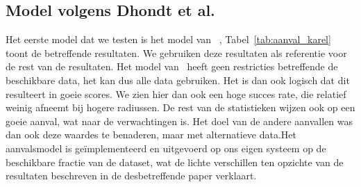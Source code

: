 \subsection{Model volgens Dhondt et al.}
Het eerste model dat we testen is het model van
\citeauthor{Dhondt}~\cite{Dhondt}, Tabel~\ref{tab:aanval_karel} toont de
betreffende resultaten. We gebruiken deze resultaten als referentie voor de
rest van de resultaten. Het model van~\citeauthor{Dhondt} heeft geen
restricties betreffende de beschikbare data, het kan dus alle data gebruiken.
Het is dan ook logisch dat dit resulteert in goeie scores. We zien hier dan ook
een hoge succes rate, die relatief weinig afneemt bij hogere radiussen. De rest
van de statistieken wijzen ook op een goeie aanval, wat naar de verwachtingen
is. Het doel van de andere aanvallen was dan ook deze waardes te benaderen,
maar met alternatieve data.Het aanvalsmodel is geïmplementeerd en uitgevoerd op
ons eigen systeem op de beschikbare fractie van de dataset, wat de lichte
verschillen ten opzichte van de resultaten beschreven in de desbetreffende
paper verklaart.

